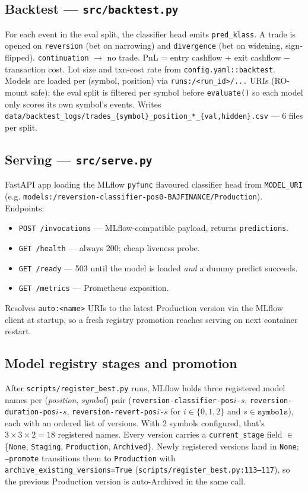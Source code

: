 \documentclass[11pt,a4paper]{article}
\begin{document}
\subsection{Backtest --- \texttt{src/backtest.py}}
For each event in the eval split, the classifier head emits \texttt{pred\_klass}. A trade is opened on \texttt{reversion} (bet on narrowing) and \texttt{divergence} (bet on widening, sign-flipped). \texttt{continuation} $\to$ no trade. PnL = entry cashflow + exit cashflow $-$ transaction cost. Lot size and txn-cost rate from \texttt{config.yaml::backtest}. Models are loaded per (symbol, position) via \texttt{runs:/<run\_id>/...} URIs (RO-mount safe); the eval split is filtered per symbol before \texttt{evaluate()} so each model only scores its own symbol's events. Writes \texttt{data/backtest\_logs/trades\_\{symbol\}\_position\_*\_\{val,hidden\}.csv} --- 6 files per split.

\subsection{Serving --- \texttt{src/serve.py}}
FastAPI app loading the MLflow \texttt{pyfunc} flavoured classifier head from \texttt{MODEL\_URI} 
\\
(e.g. \texttt{models:/reversion-classifier-pos0-BAJFINANCE/Production}). Endpoints:
\begin{itemize}[leftmargin=1.5em,itemsep=0pt]
  \item \texttt{POST /invocations} --- MLflow-compatible payload, returns \texttt{predictions}.
  \item \texttt{GET /health} --- always 200; cheap liveness probe.
  \item \texttt{GET /ready} --- 503 until the model is loaded \emph{and} a dummy predict succeeds.
  \item \texttt{GET /metrics} --- Prometheus exposition.
\end{itemize}
Resolves \texttt{auto:<name>} URIs to the latest Production version via the MLflow client at startup, so a fresh registry promotion reaches serving on next container restart.

\subsection{Model registry stages and promotion}

After \texttt{scripts/register\_best.py} runs, MLflow holds three registered model names per (\emph{position}, \emph{symbol}) pair (\texttt{reversion-classifier-pos$i$-$s$}, \texttt{reversion-duration-pos$i$-$s$}, \texttt{reversion-revert-pos$i$-$s$} for $i \in \{0,1,2\}$ and $s \in \texttt{symbols}$), each with an ordered list of versions. With 2 symbols configured, that's $3 \times 3 \times 2 = 18$ registered names. Every version carries a \texttt{current\_stage} field $\in$ \{\texttt{None}, \texttt{Staging}, \texttt{Production}, \texttt{Archived}\}. Newly registered versions land in \texttt{None}; \texttt{--promote} transitions them to \texttt{Production} with \texttt{archive\_existing\_versions=True} (\texttt{scripts/register\_best.py:113--117}), so the previous Production version is auto-Archived in the same call.
\end{document}
